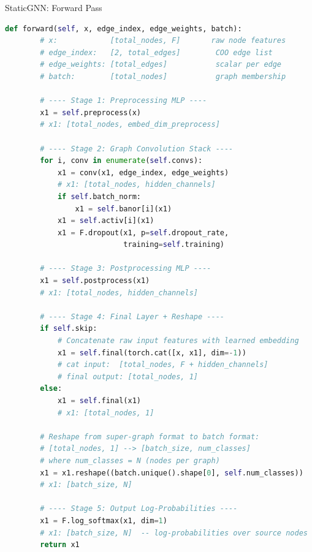\begin{codewalk}{StaticGNN: Forward Pass}
\begin{lstlisting}[language=Python]
    def forward(self, x, edge_index, edge_weights, batch):
        # x:            [total_nodes, F]       raw node features
        # edge_index:   [2, total_edges]        COO edge list
        # edge_weights: [total_edges]           scalar per edge
        # batch:        [total_nodes]           graph membership

        # ---- Stage 1: Preprocessing MLP ----
        x1 = self.preprocess(x)
        # x1: [total_nodes, embed_dim_preprocess]

        # ---- Stage 2: Graph Convolution Stack ----
        for i, conv in enumerate(self.convs):
            x1 = conv(x1, edge_index, edge_weights)
            # x1: [total_nodes, hidden_channels]
            if self.batch_norm:
                x1 = self.banor[i](x1)
            x1 = self.activ[i](x1)
            x1 = F.dropout(x1, p=self.dropout_rate,
                           training=self.training)

        # ---- Stage 3: Postprocessing MLP ----
        x1 = self.postprocess(x1)
        # x1: [total_nodes, hidden_channels]

        # ---- Stage 4: Final Layer + Reshape ----
        if self.skip:
            # Concatenate raw input features with learned embedding
            x1 = self.final(torch.cat([x, x1], dim=-1))
            # cat input:  [total_nodes, F + hidden_channels]
            # final output: [total_nodes, 1]
        else:
            x1 = self.final(x1)
            # x1: [total_nodes, 1]

        # Reshape from super-graph format to batch format:
        # [total_nodes, 1] --> [batch_size, num_classes]
        # where num_classes = N (nodes per graph)
        x1 = x1.reshape((batch.unique().shape[0], self.num_classes))
        # x1: [batch_size, N]

        # ---- Stage 5: Output Log-Probabilities ----
        x1 = F.log_softmax(x1, dim=1)
        # x1: [batch_size, N]  -- log-probabilities over source nodes
        return x1
\end{lstlisting}
\end{codewalk}


